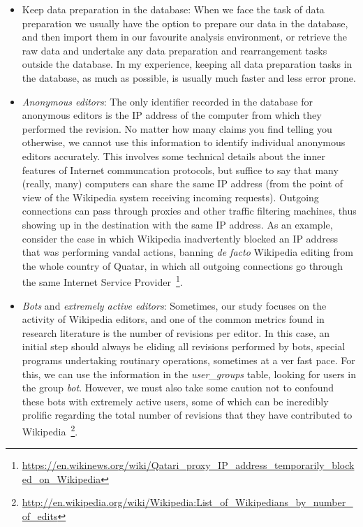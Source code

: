 \begin{itemize}
 \item Keep data preparation in the database: When we face the task of data preparation
we usually have the option to prepare our data in the database, and then import them
in our favourite analysis environment, or retrieve the raw data and undertake any
data preparation and rearrangement tasks outside the database. In my experience, keeping
all data preparation tasks in the database, as much as possible, is usually much
faster and less error prone.

 \item \textit{Anonymous editors}: The only identifier recorded in the
database for anonymous editors is the IP address of the computer from which they
performed the revision. No matter how many claims you find telling you otherwise, we
cannot use this information to identify individual anonymous editors accurately.
This involves some technical details about the inner features of Internet communcation
protocols, but suffice to say that many (really, many) computers can share the same
IP address (from the point of view of the Wikipedia system receiving incoming
requests). Outgoing connections can pass through proxies and other traffic filtering
machines, thus showing up in the destination with the same IP address. As an example,
consider the case in which Wikipedia inadvertently blocked an IP address that was
performing vandal actions, banning \textit{de facto} Wikipedia editing from the whole
country of Quatar, in which all outgoing connections go through the same Internet
Service Provider~\footnote{\url{https://en.wikinews.org/wiki/Qatari\_proxy\_IP\_address\_temporarily\_blocked\_on\_Wikipedia}}.

 \item \textit{Bots} and \textit{extremely active editors}: Sometimes, our study
focuses on the activity of Wikipedia editors, and one of the common metrics found
in research literature is the number of revisions per editor. In this case, an
initial step should always be eliding all revisions performed by bots, special
programs undertaking routinary operations, sometimes at a ver fast pace. For this,
we can use the information in the \textit{user\_groups} table, looking for users
in the group \textit{bot}. However, we must also take some caution not to confound
these bots with extremely active users, some of which can be incredibly prolific
regarding the total number of revisions that they have contributed to 
Wikipedia~\footnote{\url{http://en.wikipedia.org/wiki/Wikipedia:List_of_Wikipedians_by_number_of_edits}}.


\end{itemize}
